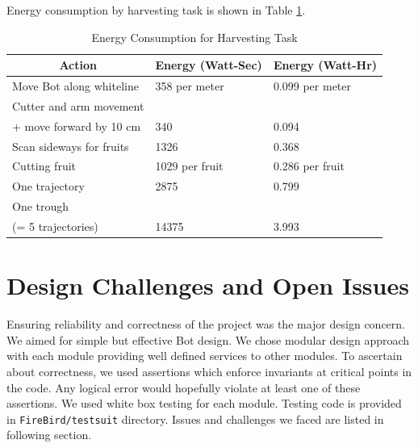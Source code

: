 \documentclass[a4paper, 12pt]{article}
\begin{document}
 Energy consumption by harvesting task is shown in Table \ref{table-energy}.
 \begin{table}
  \centering
  \begin{tabular}{|l|l|l|}
 \hline
 \multicolumn{1}{|c|}{\textbf{Action}} & \multicolumn{1}{|c|}{\textbf{Energy (Watt-Sec)}} & 
 \multicolumn{1}{|c|}{\textbf{Energy (Watt-Hr)}}\\
 \hline
 \hline
 Move Bot along whiteline & 358 per meter & 0.099 per meter\\
 \hline
 Cutter and arm movement & &\\
 + move forward by 10 cm & 340 & 0.094\\
 \hline
 Scan sideways for fruits & 1326 & 0.368\\
 \hline
 Cutting fruit & 1029 per fruit & 0.286 per fruit\\
 \hline
 One trajectory & 2875 & 0.799\\
 \hline
 One trough & &  \\
 (= 5 trajectories)& 14375 & 3.993\\
 \hline
 \end{tabular}
 \caption{Energy Consumption for Harvesting Task}
 \label{table-energy}
 \end{table}
 
 \section{Design Challenges and Open Issues}
 Ensuring reliability and correctness of the project was the major design concern. We aimed for simple but effective
 Bot design. We chose modular design approach with each module providing well defined services to other modules.
 To ascertain about correctness, we used assertions which enforce invariants at critical points in the code. 
 Any logical error would hopefully violate at least one of these assertions. We used white box testing for each module.
 Testing code is provided in \texttt{FireBird/testsuit} directory. 
 Issues and challenges we faced are listed in following section.
\end{document}
